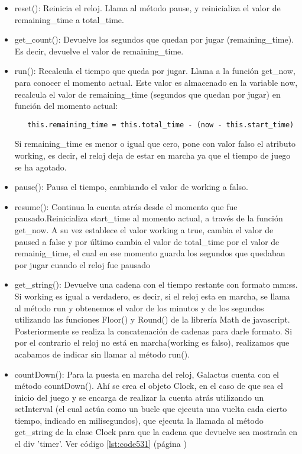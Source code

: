\begin{itemize}
 \item reset(): Reinicia el reloj. Llama al método pause, y reinicializa el valor de remaining\_time a total\_time.

 \item get\_count(): Devuelve los segundos que quedan por jugar (remaining\_time). Es decir, devuelve el valor de remaining\_time.

 \item run(): Recalcula el tiempo que queda por jugar. Llama a la función get\_now, para conocer el momento actual. Este valor es 
 almacenado en la variable now, recalcula el valor de remaining\_time (segundos que quedan por jugar) en función del momento actual:
\begin{verbatim}
   this.remaining_time = this.total_time - (now - this.start_time)
\end{verbatim}
        
Si remaining\_time es menor o igual que cero, pone con valor falso el atributo working, es decir, el reloj deja de estar en marcha ya 
que el tiempo de juego se ha agotado.

 \item pause(): Pausa el tiempo, cambiando el valor de working a falso.

 \item resume(): Continua la cuenta atrás desde el momento que fue pausado.Reinicializa start\_time al momento actual, a través de 
 la función get\_now. A su vez establece el valor working a true, cambia el valor de paused a false y por último cambia el valor de 
 total\_time por el valor de remainig\_time, el cual en ese momento guarda los segundos que quedaban por jugar cuando el reloj fue pausado

 \item get\_string(): Devuelve una cadena con el tiempo restante con formato mm:ss. Si working es igual a verdadero, es decir, 
 si el reloj esta en marcha, se llama al método run y obtenemos el valor de los minutos y de los segundos utilizando las 
 funciones Floor() y Round() de la librería Math de javascript. Posteriormente se realiza la concatenación de cadenas para 
darle formato. Si por el contrario el reloj no está en marcha(working es falso), realizamos que acabamos de indicar sin 
llamar al método run().

 \item countDown(): Para la puesta en marcha del reloj, Galactus cuenta con el método countDown(). Ahí se crea el objeto Clock, en el 
 caso de que sea el inicio del juego y se encarga de realizar la cuenta atrás utilizando un setInterval (el cual actúa como un bucle 
 que ejecuta una vuelta cada cierto tiempo, indicado en milisegundos), que ejecuta la llamada al método get\_string de la clase Clock 
 para que la cadena que devuelve sea mostrada en el div 'timer'. Ver código \ref{lst:code531} (página \pageref{lst:code531})
\end{itemize}

